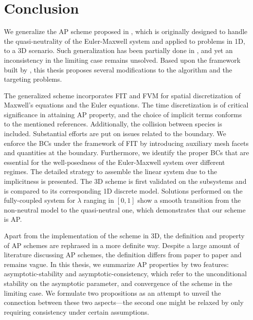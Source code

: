 \documentclass{report}
\begin{document}
\chapter{Conclusion}
We generalize the AP scheme proposed in \cite{degond_2012}, which is originally designed to handle the quasi-neutrality of the Euler-Maxwell system and applied to problems in 1D, to a 3D scenario. Such generalization has been partially done in \cite{fuchs_2021}, and yet an inconsistency in the limiting case remains unsolved. Based upon the framework built by \cite{fuchs_2021}, this thesis proposes several modifications to the algorithm and the targeting problems.    

The generalized scheme incorporates FIT and FVM for spatial discretization of Maxwell's equations and the Euler equations. The time discretization is of critical significance in attaining AP property, and the choice of implicit terms conforms to the mentioned references. Additionally, the collision between species is included. Substantial efforts are put on issues related to the boundary. We enforce the BCs under the framework of FIT by introducing auxiliary mesh facets and quantities at the boundary. Furthermore, we identify the proper BCs that are essential for the well-posedness of the Euler-Maxwell system over different regimes. The detailed strategy to assemble the linear system due to the implicitness is presented. The 3D scheme is first validated on the subsystems and is compared to its corresponding 1D discrete model. Solutions performed on the fully-coupled system for $\lambda$ ranging in $[0,1]$ show a smooth transition from the non-neutral model to the quasi-neutral one, which demonstrates that our scheme is AP.

Apart from the implementation of the scheme in 3D, the definition and property of AP schemes are rephrased in a more definite way. Despite a large amount of literature discussing AP schemes, the definition differs from paper to paper and remains vague. In this thesis, we summarize AP properties by two features: asymptotic-stability and asymptotic-consistency, which refer to the unconditional stability on the asymptotic parameter, and convergence of the scheme in the limiting case. We formulate two propositions as an attempt to unveil the connection between these two aspects---the second one might be relaxed by only requiring consistency under certain assumptions. 
\end{document}
